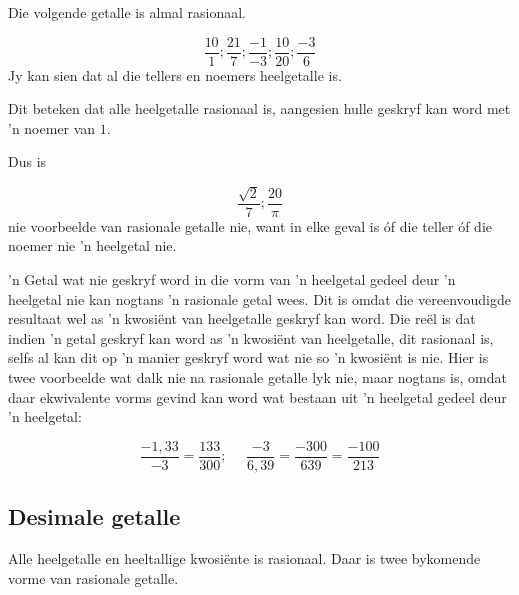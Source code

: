 Die volgende getalle is almal rasionaal.\par 
\nopagebreak\noindent{}

\begin{equation*}
\frac{10}{1};\frac{21}{7};\frac{-1}{-3};\frac{10}{20};\frac{-3}{6}
\end{equation*}
Jy kan sien dat al die tellers en noemers heelgetalle is.\par 

\par
Dit beteken dat alle heelgetalle rasionaal is, aangesien hulle geskryf kan word met ’n noemer van $1$.\par 
Dus is

\begin{equation*}
\frac{\sqrt{2}}{7} ; \frac{20}{\pi}
\end{equation*}
nie voorbeelde van rasionale getalle nie, want in elke geval is óf die teller óf die noemer nie ’n heelgetal nie.\par 
’n Getal wat nie geskryf word in die vorm van ’n heelgetal gedeel deur ’n heelgetal nie kan nogtans ’n rasionale
getal wees. Dit is omdat die vereenvoudigde resultaat wel as ’n kwosiënt van heelgetalle geskryf kan word. Die
reël is dat indien ’n getal geskryf kan word as ’n kwosiënt van heelgetalle, dit rasionaal is, selfs al kan dit op ’n
manier geskryf word wat nie so ’n kwosiënt is nie. Hier is twee voorbeelde wat dalk nie na rasionale getalle lyk
nie, maar nogtans is, omdat daar ekwivalente vorms gevind kan word wat bestaan uit ’n heelgetal gedeel deur ’n
heelgetal:\par 
\nopagebreak\noindent{}
\begin{equation*}    
\frac{-1,33}{-3}=\frac{133}{300}; ~~~~~~\frac{-3}{6,39}=\frac{-300}{639}=\frac{-100}{213}
\end{equation*}


\subsection*{Desimale getalle}
\nopagebreak

Alle heelgetalle en heeltallige kwosiënte is rasionaal. Daar is twee bykomende vorme van rasionale getalle.\par 




